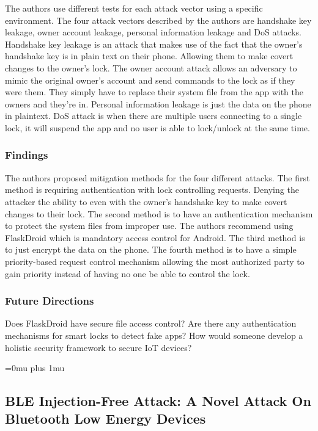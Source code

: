 \noindent
The authors use different tests for each attack vector using a specific environment. The four attack vectors described by the authors are handshake key leakage, owner account leakage, personal information leakage and DoS attacks. Handshake key leakage is an attack that makes use of the fact that the owner’s handshake key is in plain text on their phone. Allowing them to make covert changes to the owner’s lock. The owner account attack allows an adversary to mimic the original owner’s account and send commands to the lock as if they were them. They simply have to replace their system file from the app with the owners and they’re in. Personal information leakage is just the data on the phone in plaintext. DoS attack is when there are multiple users connecting to a single lock, it will suspend the app and no user is able to lock/unlock at the same time.



\subsubsection{Findings}

\noindent
The authors proposed mitigation methods for the four different attacks. The first method is requiring authentication with lock controlling requests. Denying the attacker the ability to even with the owner’s handshake key to make covert changes to their lock. The second method is to have an authentication mechanism to protect the system files from improper use. The authors recommend using FlaskDroid which is mandatory access control for Android. The third method is to just encrypt the data on the phone. The fourth method is to have a simple priority-based request control mechanism allowing the most authorized party to gain priority instead of having no one be able to control the lock.

\subsubsection{Future Directions}

\noindent
Does FlaskDroid have secure file access control? Are there any authentication mechanisms for smart locks to detect fake apps? How would someone develop a holistic security framework to secure IoT devices?

\Urlmuskip=0mu plus 1mu\relax


\noindent
\subsection{BLE Injection-Free Attack: A Novel Attack On Bluetooth Low Energy Devices}

